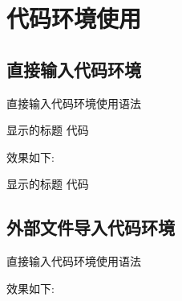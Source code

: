 \section{代码环境使用} \label{sec:代码环境使用}
  \subsection{直接输入代码环境} \label{sbsec:直接输入代码环境}
    \begin{Win}[LaTeX]{直接输入代码环境使用语法}
      \begin{Code}[minted高亮语言][交叉引用标签][右上角显示语言]{显示的标题}
        代码
      \end{Code}
    \end{Win}
    效果如下:
    \begin{Code}[sh][交叉引用标签][右上角显示语言]{显示的标题}
      代码
    \end{Code}

  \subsection{外部文件导入代码环境} \label{sbsec:外部文件导入代码环境}
    \begin{Win}[LaTeX]{直接输入代码环境使用语法}
    \end{Win}
    效果如下:
